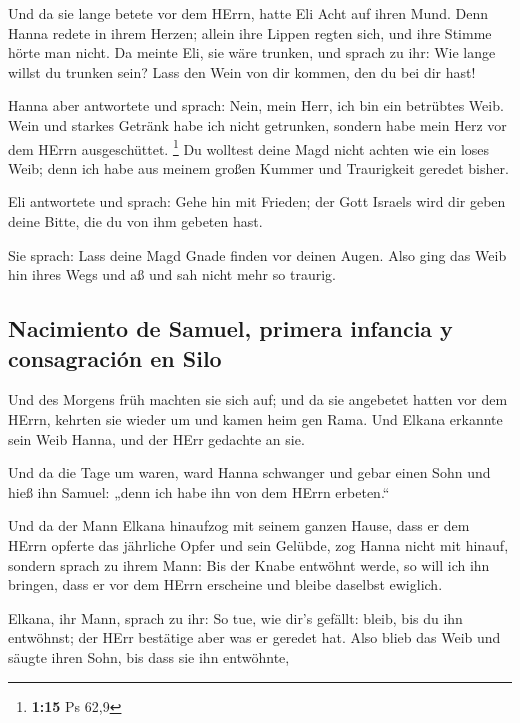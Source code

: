  Und da sie lange betete vor dem HErrn, hatte Eli Acht
auf ihren Mund.  Denn Hanna redete in ihrem Herzen;
allein ihre Lippen regten sich, und ihre Stimme hörte man nicht. Da
meinte Eli, sie wäre trunken,  und sprach zu ihr: Wie
lange willst du trunken sein? Lass den Wein von dir kommen, den du bei
dir hast!

 Hanna aber antwortete und sprach: Nein, mein Herr, ich
bin ein betrübtes Weib. Wein und starkes Getränk habe ich nicht
getrunken, sondern habe mein Herz vor dem HErrn ausgeschüttet.
\footnote{\textbf{1:15} Ps 62,9}  Du wolltest deine Magd
nicht achten wie ein loses Weib; denn ich habe aus meinem großen Kummer
und Traurigkeit geredet bisher.

 Eli antwortete und sprach: Gehe hin mit Frieden; der
Gott Israels wird dir geben deine Bitte, die du von ihm gebeten hast.

 Sie sprach: Lass deine Magd Gnade finden vor deinen
Augen. Also ging das Weib hin ihres Wegs und aß und sah nicht mehr so
traurig.

\hypertarget{nacimiento-de-samuel-primera-infancia-y-consagraciuxf3n-en-silo}{%
\subsection{Nacimiento de Samuel, primera infancia y consagración en
Silo}\label{nacimiento-de-samuel-primera-infancia-y-consagraciuxf3n-en-silo}}

 Und des Morgens früh machten sie sich auf; und da sie
angebetet hatten vor dem HErrn, kehrten sie wieder um und kamen heim gen
Rama. Und Elkana erkannte sein Weib Hanna, und der HErr gedachte an sie.

 Und da die Tage um waren, ward Hanna schwanger und gebar
einen Sohn und hieß ihn Samuel: „denn ich habe ihn von dem HErrn
erbeten.``

 Und da der Mann Elkana hinaufzog mit seinem ganzen
Hause, dass er dem HErrn opferte das jährliche Opfer und sein Gelübde,
 zog Hanna nicht mit hinauf, sondern sprach zu ihrem
Mann: Bis der Knabe entwöhnt werde, so will ich ihn bringen, dass er vor
dem HErrn erscheine und bleibe daselbst ewiglich.

 Elkana, ihr Mann, sprach zu ihr: So tue, wie dir's
gefällt: bleib, bis du ihn entwöhnst; der HErr bestätige aber was er
geredet hat. Also blieb das Weib und säugte ihren Sohn, bis dass sie ihn
entwöhnte,

